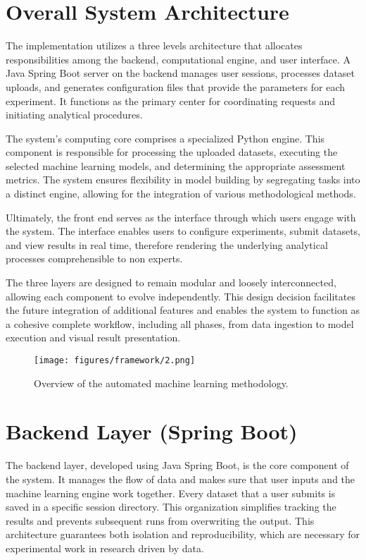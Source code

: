 \section{Overall System Architecture}
The implementation utilizes a three levels architecture that allocates responsibilities among the backend, computational engine, and user interface. A Java Spring Boot server on the backend manages user sessions, processes dataset uploads, and generates configuration files that provide the parameters for each experiment. It functions as the primary center for coordinating requests and initiating analytical procedures.  

The system's computing core comprises a specialized Python engine. This component is responsible for processing the uploaded datasets, executing the selected machine learning models, and determining the appropriate assessment metrics. The system ensures flexibility in model building by segregating tasks into a distinct engine, allowing for the integration of various methodological methods.  

Ultimately, the front end serves as the interface through which users engage with the system. The interface enables users to configure experiments, submit datasets, and view results in real time, therefore rendering the underlying analytical processes comprehensible to non experts.  

The three layers are designed to remain modular and loosely interconnected, allowing each component to evolve independently. This design decision facilitates the future integration of additional features and enables the system to function as a cohesive complete workflow, including all phases, from data ingestion to model execution and visual result presentation.

\begin{figure}[htbp]
  \centering
  \texttt{[image: figures/framework/2.png]}
  \caption[Overview of the automated machine learning methodology.]{Overview of the automated machine learning methodology.}
  \label{fig:overview_automated}
\end{figure}


\section{Backend Layer (Spring Boot)}
The backend layer, developed using Java Spring Boot, is the core component of the system. It manages the flow of data and makes sure that user inputs and the machine learning engine work together. Every dataset that a user submits is saved in a specific session directory. This organization simplifies tracking the results and prevents subsequent runs from overwriting the output. This architecture guarantees both isolation and reproducibility, which are necessary for experimental work in  research driven by data. 

